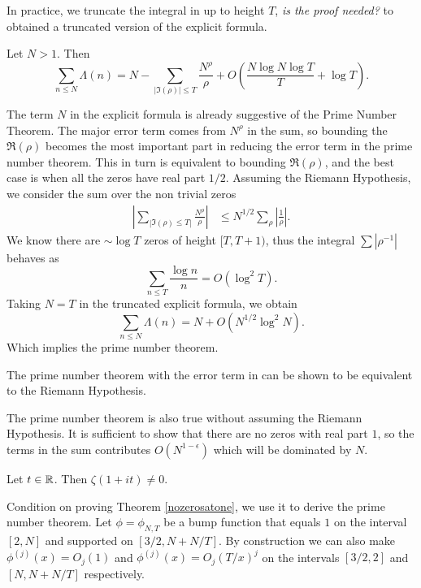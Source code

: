 In practice, we truncate the integral in \label{preexplicit} up to height $T$, \textit{is the proof needed?} to obtained a truncated version of the explicit formula.
\begin{theorem}
    Let $N>1$. Then\begin{equation}
        \sum_{n\leq N} \Lambda(n) = N - \sum_{|\Im{(\rho)}|\leq T} \frac{N^\rho}{\rho} + O(\frac{N\log N \log T}{T} + \log T). 
        \end{equation}
\end{theorem}
The term $N$ in the explicit formula is already suggestive of the Prime Number Theorem. 
The major error term comes from $N^\rho$ in the sum, so bounding the $\Re(\rho)$ becomes the most important part in reducing the error term in the prime number theorem. 
This in turn is equivalent to bounding $\Re({\rho})$, and the best case is when all the zeros have real part $1/2$.
Assuming the Riemann Hypothesis, we consider the sum over the non trivial zeros \begin{align*}
\left|\sum_{|\Im(\rho)\leq T|}\frac{N^\rho}{\rho}\right| &\leq N^{1/2} \sum_{\rho}\left|{\frac{1}{\rho}}\right|.    
\end{align*}
We know there are $\sim \log T$ zeros of height $[T,T+1)$, thus the integral $\sum |\rho^{-1}|$ behaves as \[
\sum_{n\leq T} \frac{\log n}{n} = O(\log^2 T).
\]
Taking $N=T$ in the truncated explicit formula, we obtain \begin{equation} \label{RHPNT}
    \sum_{n\leq N} \Lambda(n) = N + O(N^{1/2}\log^2 N).
\end{equation}
Which implies the prime number theorem.
\begin{remark}
    The prime number theorem with the error term in \label{RHPNT} can be shown to be equivalent to the Riemann Hypothesis.
\end{remark}
The prime number theorem is also true without assuming the Riemann Hypothesis. 
It is sufficient to show that there are no zeros with real part $1$, so the terms in the sum contributes $O(N^{1-\epsilon})$
which will be dominated by $N$.
\begin{theorem}\label{nozerosatone}
    Let $t\in\mathbb{R}$. Then $\zeta(1+it)\neq 0$.
\end{theorem}
Condition on proving Theorem \ref{nozerosatone}, we use it to derive the prime number theorem.
Let $\phi=\phi_{N,T}$ be a bump function that equals $1$ on the interval $[2,N]$ and supported on $[3/2, N+N/T]$.
By construction we can also make $\phi^{(j)}(x)=O_j(1)$ and $\phi^{(j)}(x)=O_j(T/x)^j$ on the intervals $[3/2, 2]$ and $[N,N+N/T]$ respectively.
